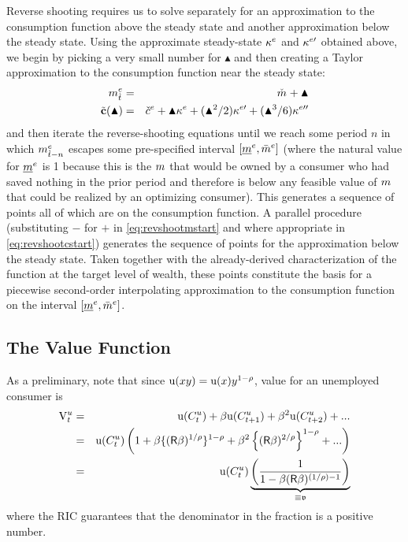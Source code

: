 \message{ !name(TractableBufferStock.tex)}\documentclass{handout}
\begin{document}
Reverse shooting requires us to solve separately for an approximation to the consumption function above the steady state and 
another approximation below the steady state.  Using the approximate steady-state $\kappa^{e}$ and $\kappa^{e\prime}$ 
obtained above, we begin by picking a very small number for $\blacktriangle$ and then creating a Taylor
approximation to the consumption function near the steady state:
\begin{eqnarray}
  \mRatE_{\Alt{t}} & = & \mTarg^{\null} + \blacktriangle  \label{eq:revshootmstart} 
\\ \tilde{\mathbf{c}}(\blacktriangle) & = & \cTarg^{e} + \blacktriangle \MPCE+ (\blacktriangle^{2}/2) \MPC^{e\prime}+ (\blacktriangle^{3}/6) \MPC^{e\prime\prime} \label{eq:revshootcstart}
\end{eqnarray}
and then iterate the reverse-shooting equations until we reach some period $n$ in
which $m^{e}_{\grave{t}-n}$ escapes some pre-specified interval $[\underline{m}^{e},\bar{m}^{e}]$ (where the natural 
value for $\underline{m}^{e}$ is 1 because this is the $m$ that would be owned by a consumer who had saved
nothing in the prior period and therefore is below any feasible value of $m$ that could be realized by an 
optimizing consumer).  This generates a sequence of points all of which
are on the consumption function.  A parallel procedure (substituting $-$ for
$+$ in \eqref{eq:revshootmstart} and where appropriate in \eqref{eq:revshootcstart}) generates the sequence of points for the approximation below the 
steady state.  Taken together with the already-derived characterization of the function
at the target level of wealth, these points constitute the basis for a piecewise second-order interpolating approximation to the
consumption function on the interval $[\underline{m}^{e},\bar{m}^{e}]$.

\subsection{The Value Function}

As a preliminary, note that since ${\mathrm{u}}(xy)={\mathrm{u}}(x)y^{1-\rho}$, value for an unemployed consumer is 
\begin{eqnarray}
  \mathrm{V}_{t}^{u} & = & {\mathrm{u}}(C_{t}^{u})+\beta {\ensuremath{\mathrm{u}}}(C_{t+1}^{u}) + \beta^{2} {\mathrm{u}}(C_{t+2}^{u})+...
\\ & = & {\mathrm{u}}(C_{t}^{u})\left(1+\beta \{(\mathsf{R} \beta)^{1/\rho}\}^{1-\rho} + \beta^{2}\left\{(\mathsf{R} \beta)^{2/\rho}\right\}^{1-\rho}+...\right)
\\ & = & {\mathrm{u}}(C_{t}^{u})\underbrace{\left(\frac{1}{1-\beta (\mathsf{R} \beta)^{(1/\rho)-1}}\right)}_{\equiv \mathfrak{v}}
\end{eqnarray}
where the RIC guarantees that the denominator in the fraction is a positive number.  
\end{document}
